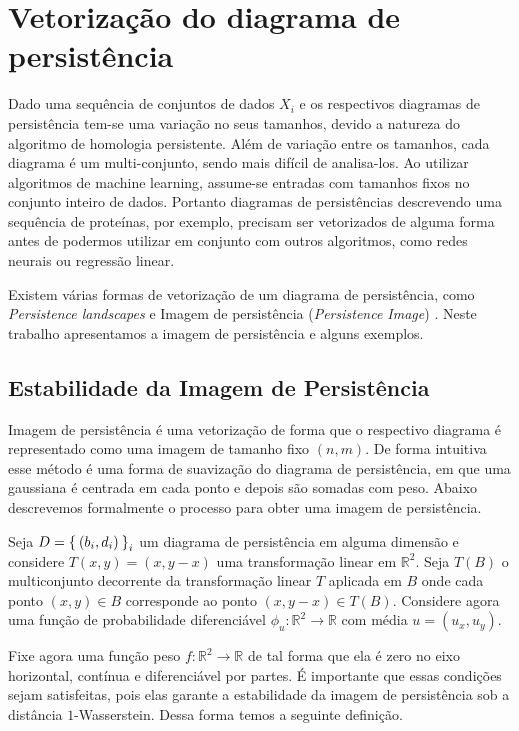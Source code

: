\section{Vetorização do diagrama de persistência}
Dado uma sequência de conjuntos de dados $X_i$ e os respectivos diagramas de persistência tem-se uma variação no
seus tamanhos, devido a natureza do algoritmo de homologia persistente. Além de variação entre os tamanhos, cada 
diagrama é um multi-conjunto, sendo mais difícil de analisa-los. Ao utilizar algoritmos de machine learning, 
assume-se entradas com tamanhos fixos no conjunto inteiro de dados. Portanto diagramas de persistências descrevendo
uma sequência de proteínas, por exemplo, precisam ser vetorizados de alguma forma antes de podermos utilizar em
conjunto com outros algoritmos, como redes neurais ou regressão linear. 

Existem várias formas de vetorização de um diagrama de persistência, como \textit{Persistence landscapes}
\cite{bubenik15a} e Imagem de persistência (\textit{Persistence Image}) \cite{Adams2017}. Neste trabalho apresentamos
a imagem de persistência e alguns exemplos.

\subsection{Estabilidade da Imagem de Persistência}
Imagem de persistência é uma vetorização de forma que o respectivo diagrama é representado como 
uma imagem de tamanho fixo $(n,m)$. De forma intuitiva esse método é uma forma de suavização do diagrama 
de persistência, em que uma gaussiana é centrada em cada ponto e depois são somadas com peso. Abaixo descrevemos
formalmente o processo para obter uma imagem de persistência.

Seja $D = \Set{(b_i,d_i)}_{i}$ um diagrama de persistência em alguma dimensão e considere $T(x,y) = (x, y-x)$ 
uma transformação linear em $\mathbb{R}^2$. Seja $T(B)$ o multiconjunto decorrente da transformação linear $T$
aplicada em $B$ onde cada ponto $(x,y) \in B$ corresponde ao ponto $(x,y-x) \in T(B)$. Considere agora uma 
função de probabilidade diferenciável $\phi_u\colon \mathbb{R}^2 \to \mathbb{R}$ com média $u=(u_x, u_y)$. 

Fixe agora uma função peso $f\colon \mathbb{R}^2 \to \mathbb{R}$ de tal forma que ela é zero no eixo horizontal,
contínua e diferenciável por partes. É importante que essas condições sejam satisfeitas, pois elas garante
a estabilidade da imagem de persistência sob a distância $1$-Wasserstein. Dessa forma temos a seguinte definição. 

